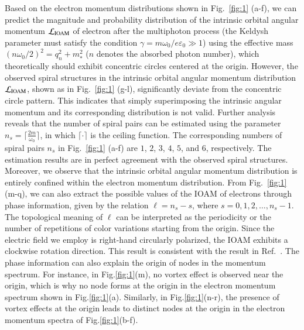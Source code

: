 \documentclass[prl,twocolumn,floatfix,amsmath,nofootinbib,superscriptaddress,amssymb,preprintnumbers,floatfix]{revtex4-1}
\begin{document}
Based on the electron momentum distributions shown in Fig.~\ref{fig:1} (a-f), we can predict the magnitude and probability distribution of the intrinsic orbital angular momentum $\mathcal{L}_{\rm IOAM}$ of electron after the multiphoton process (the Keldysh parameter must satisfy the condition $\gamma=m\omega_{0}/e\varepsilon_{0}\gg 1$) using the effective mass $(n\omega_{0}/{2})^2 =q^2_n +m^{2}_{*}$ ($n$ denotes the absorbed photon number), which theoretically should exhibit concentric circles centered at the origin. However, the observed spiral structures in the intrinsic orbital angular momentum distribution $\mathcal{L}_{\rm IOAM}$, shown as in Fig.~\ref{fig:1} (g-l), significantly deviate from the concentric circle pattern. This indicates that simply superimposing the intrinsic angular momentum and its corresponding distribution is not valid. Further analysis reveals that the number of spiral pairs can be estimated using the parameter $n_{s}=\lceil \frac{2m}{\omega_{0}} \rceil$, in which $\lceil \cdot \rceil$ is the ceiling function. The corresponding numbers of spiral pairs $n_{s}$ in Fig.~\ref{fig:1} (a-f) are $1$, $2$, $3$, $4$, $5$, and $6$, respectively. The estimation results are in perfect agreement with the observed spiral structures. Moreover, we observe that the intrinsic orbital angular momentum distribution is entirely confined within the electron momentum distribution.
From Fig.~\ref{fig:1} (m-q), we can also extract the possible values of the IOAM of electrons through phase information, given by the relation $\ell = n_s - s$, where $s = 0, 1, 2, \dots, n_s-1$.  The topological meaning of $\ell$ can be interpreted as the periodicity or the number of repetitions of color variations starting from the origin. Since the electric field we employ is right-hand circularly polarized, the IOAM exhibits a clockwise rotation direction. This result is consistent with the result in Ref.~\cite{Kohlfurst:2022edl}. The phase information can also explain the origin of nodes in the momentum spectrum. For instance, in Fig.\ref{fig:1}(m), no vortex effect is observed near the origin, which is why no node forms at the origin in the electron momentum spectrum shown in Fig.\ref{fig:1}(a). Similarly, in Fig.\ref{fig:1}(n-r), the presence of vortex effects at the origin leads to distinct nodes at the origin in the electron momentum spectra of Fig.\ref{fig:1}(b-f).
\end{document}
